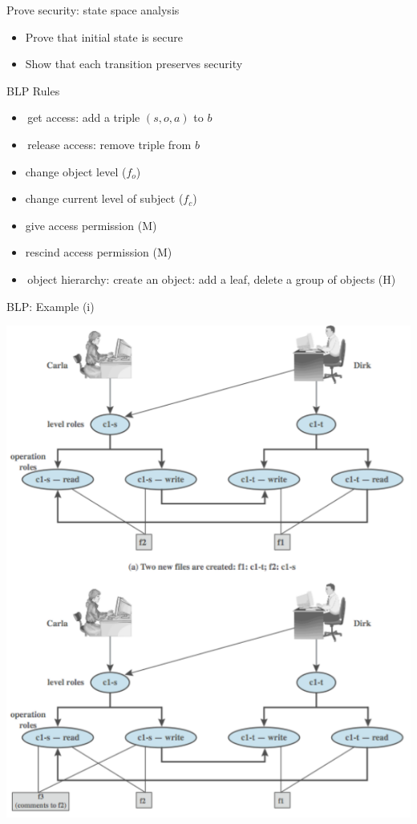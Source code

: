 \documentclass{beamer}
\begin{document}
\begin{frame}{Prove security: state space analysis}
  \begin{itemize}
  \item Prove that initial state is secure 
  \item Show that each transition preserves security
  \end{itemize}
\end{frame}

\begin{frame}{BLP Rules}
  \begin{itemize}
    \item get access: add a triple $(s,o,a)$ to $b$
    \item release access: remove triple from $b$
    \item change object level ($f_o$)
    \item change current level of subject ($f_c$)
    \item give access permission (M) 
    \item rescind access permission (M) 
    \item object hierarchy: create an object: add a leaf,
      delete a group of objects (H)
  \end{itemize}
\end{frame}

\begin{frame}{BLP: Example (i)}
  \begin{center}
    \includegraphics[width=0.5\linewidth]{example1}
  \end{center}
\end{frame}
\end{document}
